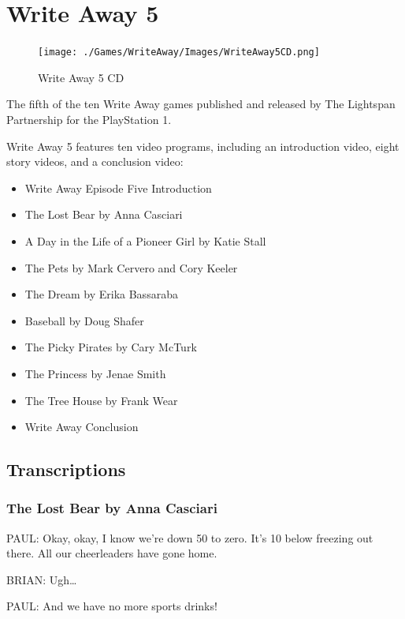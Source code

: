 \chapter{Write Away 5}

\begin{figure}[H]
    \centering
    \texttt{[image: ./Games/WriteAway/Images/WriteAway5CD.png]}
    \caption{Write Away 5 CD}
\end{figure}

The fifth of the ten Write Away games published and released by The Lightspan Partnership for the PlayStation 1.

Write Away 5 features ten video programs, including an introduction video, eight story videos, and a conclusion video:

\begin{itemize}
    \item Write Away Episode Five Introduction
    \item The Lost Bear by Anna Casciari
    \item A Day in the Life of a Pioneer Girl by Katie Stall
    \item The Pets by Mark Cervero and Cory Keeler
    \item The Dream by Erika Bassaraba
    \item Baseball by Doug Shafer
    \item The Picky Pirates by Cary McTurk
    \item The Princess by Jenae Smith
    \item The Tree House by Frank Wear
    \item Write Away Conclusion
\end{itemize}

\clearpage
\newpage

\section{Transcriptions}

\subsection{The Lost Bear by Anna Casciari}

PAUL:
Okay, okay, I know we're down 50 to zero.
It's 10 below freezing out there.
All our cheerleaders have gone home.

BRIAN:
Ugh\dots

PAUL:
And we have no more sports drinks!

